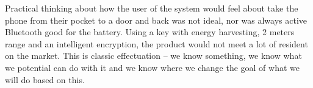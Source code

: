 \documentclass[oneside, 12pt]{article}
\begin{document}
Practical thinking about how the user of the system would feel about take the phone from their pocket to a door and back was not ideal, nor was always active Bluetooth good for the battery.
Using a key with energy harvesting, 2 meters range and an intelligent encryption, the product would not meet a lot of resident on the market.
This is classic effectuation -- we know something, we know what we potential can do with it and we know where we change the goal of what we will do based on this.
\end{document}
